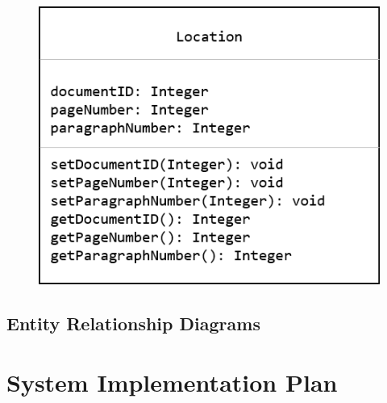 \documentclass[11pt,letterpaper]{article}
\begin{document}
\begin{figure}[H]
\includegraphics{class_location}
\centering
\end{figure}

\newpage

\subsection{Entity Relationship Diagrams}
\begin{figure}[H]
\centering
\end{figure}

\newpage

\section{System Implementation Plan}
\end{document}
